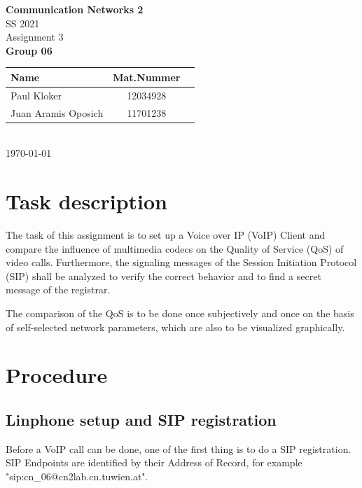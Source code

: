 \documentclass[parskip=full]{scrartcl}
\begin{document}
\begin{titlepage}
    \centering
    \vspace*{2cm}
    {\Huge \textbf{Communication Networks 2}}\\
    SS 2021\\
    \vspace*{1cm}
    {\Large Assignment 3}
    \\\vspace*{3cm}
    {\Large \textbf{Group 06}}\\
    \vspace*{1cm}
    {\large 
        \begin{tabular}{l c c}
            Name & Mat.Nummer \\ \hline
            Paul Kloker & 12034928 \\
            Juan Aramis Oposich & 11701238
        \end{tabular}
    }
    \\\vspace*{7cm}
    \today
\end{titlepage}

\section{Task description} \label{sec:task}
The task of this assignment is to set up a Voice over IP (VoIP) Client and compare the influence of multimedia codecs on the Quality of Service (QoS) of video calls.
Furthermore, the signaling messages of the Session Initiation Protocol (SIP) shall be analyzed to verify the correct behavior and to find a secret message of the registrar.

The comparison of the QoS is to be done once subjectively and once on the basis of self-selected network parameters, which are also to be visualized graphically. 


\section{Procedure} \label{sec:procedure}

\subsection{Linphone setup and SIP registration} \label{subsec:setup}
Before a VoIP call can be done, one of the first thing is to do a SIP registration. SIP Endpoints are identified by their Address of Record, for example "sip:cn\_06@cn2lab.cn.tuwien.at".
\end{document}
